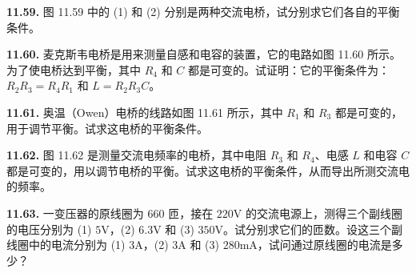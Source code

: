 \begin{center}
\end{center}

\vfill
\newpage

\textbf{11.59.} 图 11.59 中的 (1) 和 (2) 分别是两种交流电桥，试分别求它们各自的平衡条件。

\begin{center}
  \begin{minipage}[b]{0.47\linewidth}
    \centering
  \end{minipage}\hfill
  \begin{minipage}[b]{0.47\linewidth}
    \centering
  \end{minipage}
\end{center}

\vfill
\newpage

\textbf{11.60.} 麦克斯韦电桥是用来测量自感和电容的装置，它的电路如图 11.60 所示。为了使电桥达到平衡，其中 $R_{4}$ 和 $C$ 都是可变的。试证明：它的平衡条件为：$R_{2}R_{3} = R_{4}R_{1}$ 和 $L = R_{2}R_{3}C$。

\begin{center}
\end{center}

\vfill
\newpage

\textbf{11.61.} 奥温（Owen）电桥的线路如图 11.61 所示，其中 $R_{1}$ 和 $R_{3}$ 都是可变的，用于调节平衡。试求这电桥的平衡条件。

\begin{center}
\end{center}

\vfill
\newpage

\textbf{11.62.} 图 11.62 是测量交流电频率的电桥，其中电阻 $R_{3}$ 和 $R_{4}$、电感 $L$ 和电容 $C$ 都是可变的，用以调节电桥的平衡。试求这电桥的平衡条件，从而导出所测交流电的频率。

\begin{center}
\end{center}

\vfill
\newpage

\textbf{11.63.} 一变压器的原线圈为 $660$ 匝，接在 $220\mathrm{V}$ 的交流电源上，测得三个副线圈的电压分别为 (1) $5\mathrm{V}$，(2) $6.3\mathrm{V}$ 和 (3) $350\mathrm{V}$。试分别求它们的匝数。设这三个副线圈中的电流分别为 (1) $3\mathrm{A}$，(2) $3\mathrm{A}$ 和 (3) $280\mathrm{mA}$，试问通过原线圈的电流是多少？

